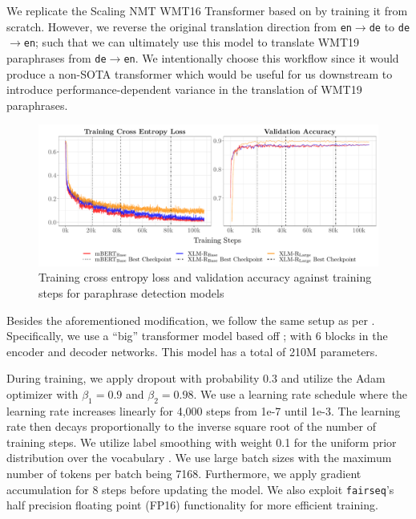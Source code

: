 \documentclass[11pt,a4paper]{article}
\begin{document}
We replicate the Scaling NMT WMT16 Transformer based on \citet{ott2018scaling} by training it from scratch. However, we reverse the original translation direction from \texttt{en$\rightarrow$de} to \texttt{de$\rightarrow$en}; such that we can ultimately use this model to translate WMT19 paraphrases from \texttt{de$\rightarrow$en}. We intentionally choose this workflow since it would produce a non-SOTA transformer which would be useful for us downstream to introduce performance-dependent variance in the translation of WMT19 paraphrases.

\begin{figure}
  \centering 
  \includegraphics[trim={0.7cm 0cm 0cm 0cm},clip,width=\textwidth]{paraphrase_detection_models_evolution.pdf}
  \caption{Training cross entropy loss and validation accuracy against training steps for paraphrase detection models}
  \label{paraphrase_detection_model_evolution}
\end{figure}

Besides the aforementioned modification, we follow the same setup as per \citet{ott2018scaling}. Specifically, we use a ``big'' transformer model based off \citet{vaswani2017attention}; with 6 blocks in the encoder and decoder networks. This model has a total of 210M parameters.

During training, we apply dropout \cite{srivastava2014dropout} with probability 0.3 and utilize the Adam optimizer \cite{kingma2014adam} with $\beta_1 = 0.9$ and $\beta_2=0.98$. We use a learning rate schedule where the learning rate increases linearly for 4,000 steps from 1e-7 until 1e-3. The learning rate then decays proportionally to the inverse square root of the number of training steps. We utilize label smoothing with weight 0.1 for the uniform prior distribution over the vocabulary \cite{pereyra2017regularizing}. We use large batch sizes with the maximum number of tokens per batch being 7168. Furthermore, we apply gradient accumulation for 8 steps before updating the model. We also exploit \texttt{fairseq}'s half precision floating point (FP16) functionality for more efficient training.
\end{document}
